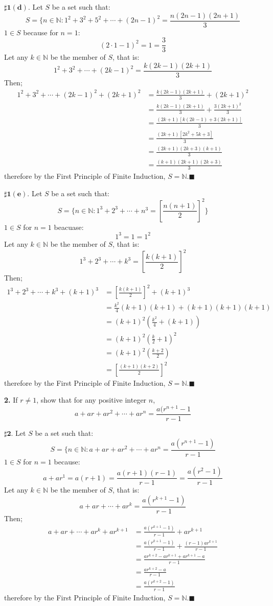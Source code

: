 \documentclass[atbegshi, chapter]{memoir}
\begin{document}
\hfill\break
$\pmb{\sharp 1(d).}$ Let $S$ be a set such that:
\[
  S = \bigg\lbrace n\in\mathbb{N}:1^2+3^2+5^2+\cdots+(2n-1)^2=
    \frac{n(2n-1)(2n+1)}{3}
\]
$1\in S$ because for $n=1$:
\[
  (2\cdot1-1)^2 = 1 = \frac{3}{3}
\]
Let any $k\in\mathbb{N}$ be the member of $S$, that is:
\[
  1^2+3^2+\cdots+(2k-1)^2=\frac{k(2k-1)(2k+1)}{3}
\]
Then;
\begin{align*}
  1^2+3^2+\cdots+(2k-1)^2+(2k+1)^2
  &= \frac{k(2k-1)(2k+1)}{3}+(2k+1)^2 \\
  &= \frac{k(2k-1)(2k+1)}{3}+\frac{3(2k+1)^2}{3} \\
  &= \frac{(2k+1)[k(2k-1)+3(2k+1)]}{3} \\
  &= \frac{(2k+1)[2k^2+5k+3]}{3} \\
  &= \frac{(2k+1)(2k+3)(k+1)}{3}\\
  &= \frac{(k+1)(2k+1)(2k+3)}{3}
\end{align*}
therefore by the First Principle of Finite Induction, 
$S=\mathbb{N}$.\hfill$\blacksquare$

\hfill\break
$\pmb{\sharp 1(e).}$ Let $S$ be a set such that:
\[
  S = \bigg\lbrace n\in\mathbb{N}: 1^3+2^3+\cdots+n^3=
    \left[\frac{n(n+1)}{2}\right]^2\bigg\rbrace
\]
$1\in S$ for $n=1$ beacuase:
\[
  1^3 = 1 = 1^2
\]
Let any $k\in\mathbb{N}$ be the member of $S$, that is:
\[
  1^3 + 2^3+ \cdots +k^3 = \left[\frac{k(k+1)}{2}\right]^2
\]
Then;
\begin{align*}
  1^3+2^3+\cdots+k^3+(k+1)^3
  &= \left[\frac{k(k+1)}{2}\right]^2+(k+1)^3 \\
  &= \frac{k^2}{4}(k+1)(k+1)+(k+1)(k+1)(k+1) \\
  &=(k+1)^2\left(\frac{k^2}{4}+(k+1)\right) \\
  &=(k+1)^2\left(\frac{k}{2}+1\right)^2\\
  &=(k+1)^2\left(\frac{k+2}{2}\right)\\
  &=\left[\frac{(k+1)(k+2)}{2}\right]^2
\end{align*}
therefore by the First Principle of Finite Induction, 
$S=\mathbb{N}.$\hfill$\blacksquare$

\hfill\break
\textbf{2. }If $r\neq1$, show that for any positive integer $n$,
\[
  a + ar + ar^2 + \cdots + ar^n = \frac{a(r^{n+1}-1}{r-1}
\]

\hfill\break
$\pmb{\sharp 2.}$ Let $S$ be a set such that:
\[
  S = \bigg\lbrace n\in\mathbb{N}: a+ar+ar^2+\cdots+ar^n=
    \frac{a(r^{n+1}-1)}{r-1}
\]
$1\in S$ for $n=1$ because:
\[
  a+ar^1 =a(r+1)=\frac{a(r+1)(r-1)}{r-1} =\frac{a(r^2-1)}{r-1}
\]
Let any $k\in\mathbb{N}$ be the member of $S$, that is:
\[
  a + ar+\cdots+ar^k=\frac{a(r^{k+1}-1)}{r-1}
\]
Then;
\begin{align*}
  a + ar +\cdots+ar^k+ar^{k+1}
  &=\frac{a(r^{k+1}-1)}{r-1}+ar^{k+1}\\
  &=\frac{a(r^{k+1}-1)}{r-1}+\frac{(r-1)ar^{k+1}}{r-1}\\
  &=\frac{ar^{k+2}-ar^{k+1}+ar^{k+1}-a}{r-1}\\
  &=\frac{ar^{k+2}-a}{r-1}\\
  &=\frac{a(r^{k+2}-1)}{r-1}
\end{align*}
therefore by the First Principle of Finite Induction,
$S=\mathbb{N}$.\hfill$\blacksquare$
\end{document}
